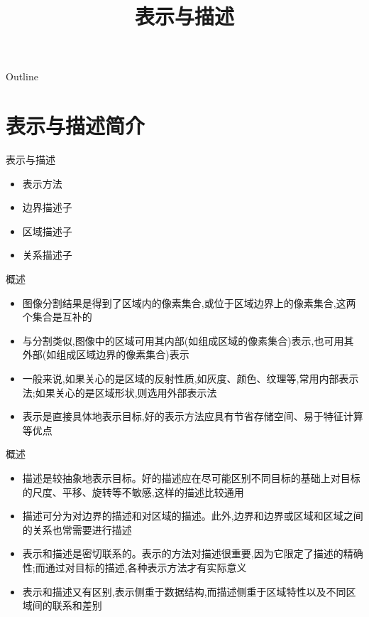 \documentclass[presentation]{beamer}
\date{}
\title{表示与描述}
\begin{document}
\maketitle
\begin{frame}{Outline}
\tableofcontents
\end{frame}











\section{表示与描述简介}
\label{sec:org02484fe}
\begin{frame}[label={sec:org68c5487}]{表示与描述}
\begin{itemize}
\item 表示方法
\item 边界描述子
\item 区域描述子
\item 关系描述子
\end{itemize}
\end{frame}
\begin{frame}[label={sec:org5932b5b}]{概述}
\begin{itemize}
\item 图像分割结果是得到了区域内的像素集合,或位于区域边界上的像素集合,这两个集合是互补的
\item 与分割类似,图像中的区域可用其内部(如组成区域的像素集合)表示,也可用其外部(如组成区域边界的像素集合)表示
\item 一般来说,如果关心的是区域的反射性质,如灰度、颜色、纹理等,常用内部表示法;如果关心的是区域形状,则选用外部表示法
\item 表示是直接具体地表示目标,好的表示方法应具有节省存储空间、易于特征计算等优点
\end{itemize}
\end{frame}
\begin{frame}[label={sec:orgd2bd701}]{概述}
\begin{itemize}
\item 描述是较抽象地表示目标。好的描述应在尽可能区别不同目标的基础上对目标的尺度、平移、旋转等不敏感,这样的描述比较通用
\item 描述可分为对边界的描述和对区域的描述。此外,边界和边界或区域和区域之间的关系也常需要进行描述
\item 表示和描述是密切联系的。表示的方法对描述很重要,因为它限定了描述的精确性;而通过对目标的描述,各种表示方法才有实际意义
\item 表示和描述又有区别,表示侧重于数据结构,而描述侧重于区域特性以及不同区域间的联系和差别
\end{itemize}
\end{frame}
\end{document}
